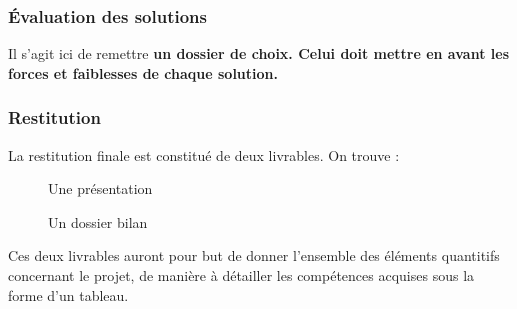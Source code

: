 \subsubsection{Évaluation des solutions}

Il s’agit ici de remettre \bf{un dossier de choix}. Celui doit mettre en avant les forces et faiblesses de chaque solution.

\subsubsection{Restitution}

La restitution finale est constitué de deux livrables. On trouve : \\

\begin{description}
    \item[\textbullet] Une présentation
    \item[\textbullet] Un dossier bilan \\
\end{description}

Ces deux livrables auront pour but de donner l’ensemble des éléments quantitifs concernant le projet, de manière à détailler les compétences acquises sous la forme d’un tableau.
